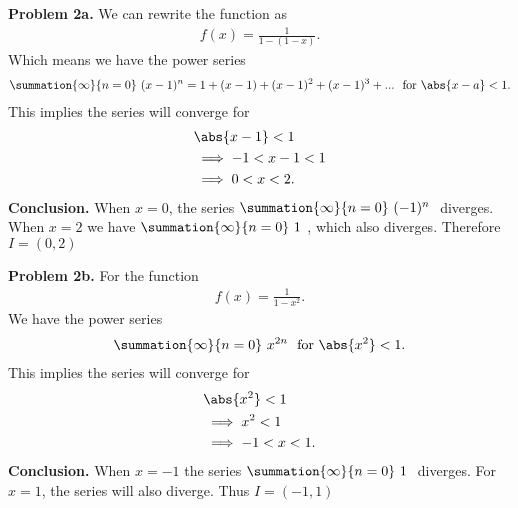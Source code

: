 \documentclass{report}
\begin{document}
    \bigbreak \noindent 
    \textbf{Problem 2a.} We can rewrite the function as
    \begin{align*}
        f(x) = \frac{1}{1-(1-x)}
    .\end{align*}
    Which means we have the power series 
    \begin{align*}
        \summation{\infty}{n=0}\ (x-1)^{n} = 1 + (x-1) + (x-1)^{2} + (x-1)^{3} + ...\ \text{ for } \abs{x-a} < 1  
    .\end{align*}
    This implies the series will converge for 
    \begin{align*}
        &\abs{x-1} < 1 \\
        &\implies -1 < x-1 < 1 \\
        &\implies 0 < x < 2
   .\end{align*}
   \bigbreak \noindent 
   \textbf{Conclusion.} When $x=0$, the series $\summation{\infty}{n=0}\ (-1)^{n}\  $ diverges. When $x=2$ we have $\summation{\infty}{n=0}\ 1\ $, which also diverges. Therefore $I=(0,2) $

   \bigbreak \noindent 
   \textbf{Problem 2b.} For the function
   \begin{align*}
       f(x) = \frac{1}{1-x^{2}}
   .\end{align*}
   We have the power series 
   \begin{align*}
       \summation{\infty}{n=0}\ x^{2n}\  \text{ for $\abs{x^{2}} < 1$}
   .\end{align*}
   \bigbreak \noindent 
   This implies the series will converge for 
   \begin{align*}
       &\abs{x^{2}} < 1 \\
       &\implies x^{2} < 1 \\
       &\implies -1 < x < 1
   .\end{align*}
   \bigbreak \noindent 
   \textbf{Conclusion.} When $x=-1$ the series $\summation{\infty}{n=0}\ 1\ $ diverges. For $x=1$, the series will also diverge. Thus $I=(-1,1) $
\end{document}
